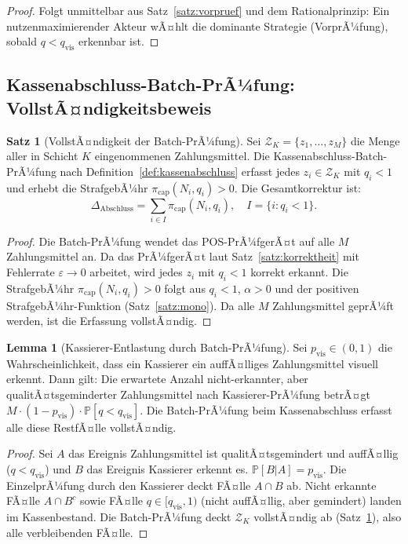 ﻿\documentclass[a4paper,12pt]{article}
\theoremstyle{definition}
\newtheorem{satz}{Satz}
\newtheorem{lemma}{Lemma}
\begin{document}
\begin{proof}
Folgt unmittelbar aus Satz~\ref{satz:vorpruef} und dem Rationalprinzip:
Ein nutzenmaximierender Akteur wÃ¤hlt die dominante Strategie
(VorprÃ¼fung), sobald $q < q_{\text{vis}}$ erkennbar ist.
\end{proof}

\subsection{Kassenabschluss-Batch-PrÃ¼fung: VollstÃ¤ndigkeitsbeweis}

\begin{satz}[VollstÃ¤ndigkeit der Batch-PrÃ¼fung]
\label{satz:batch}
Sei $\mathcal{Z}_K = \{z_1,\ldots,z_M\}$ die Menge aller in Schicht $K$
eingenommenen Zahlungsmittel.  Die Kassenabschluss-Batch-PrÃ¼fung nach
Definition~\ref{def:kassenabschluss} erfasst jedes $z_i \in \mathcal{Z}_K$
mit $q_i < 1$ und erhebt die StrafgebÃ¼hr $\pi_{\text{cap}}(N_i, q_i) > 0$.
Die Gesamtkorrektur ist:
\[
\Delta_{\text{Abschluss}} = \sum_{i \in I} \pi_{\text{cap}}(N_i, q_i),
\quad I = \{i : q_i < 1\}.
\]
\end{satz}

\begin{proof}
Die Batch-PrÃ¼fung wendet das POS-PrÃ¼fgerÃ¤t auf alle $M$ Zahlungsmittel an.
Da das PrÃ¼fgerÃ¤t laut Satz~\ref{satz:korrektheit} mit Fehlerrate
$\varepsilon \to 0$ arbeitet, wird jedes $z_i$ mit $q_i < 1$ korrekt erkannt.
Die StrafgebÃ¼hr $\pi_{\text{cap}}(N_i, q_i) > 0$ folgt aus
$q_i < 1$, $\alpha > 0$ und der positiven StrafgebÃ¼hr-Funktion
(Satz~\ref{satz:mono}).  Da alle $M$ Zahlungsmittel geprÃ¼ft werden,
ist die Erfassung vollstÃ¤ndig.
\end{proof}

\begin{lemma}[Kassierer-Entlastung durch Batch-PrÃ¼fung]
\label{lem:kassierer}
Sei $p_{\text{vis}} \in (0,1)$ die Wahrscheinlichkeit, dass ein Kassierer
ein auffÃ¤lliges Zahlungsmittel visuell erkennt.  Dann gilt:
Die erwartete Anzahl nicht-erkannter, aber qualitÃ¤tsgeminderter Zahlungsmittel
nach Kassierer-PrÃ¼fung betrÃ¤gt $M \cdot (1-p_{\text{vis}}) \cdot \mathbb{P}[q < q_{\text{vis}}]$.
Die Batch-PrÃ¼fung beim Kassenabschluss erfasst alle diese RestfÃ¤lle vollstÃ¤ndig.
\end{lemma}

\begin{proof}
Sei $A$ das Ereignis \glqq{}Zahlungsmittel ist qualitÃ¤tsgemindert und auffÃ¤llig\grqq{}
($q < q_{\text{vis}}$) und $B$ das Ereignis \glqq{}Kassierer erkennt es\grqq{}.
$\mathbb{P}[B|A] = p_{\text{vis}}$.
Die EinzelprÃ¼fung durch den Kassierer deckt FÃ¤lle $A \cap B$ ab.
Nicht erkannte FÃ¤lle $A \cap B^c$ sowie FÃ¤lle $q \in [q_{\text{vis}}, 1)$
(nicht auffÃ¤llig, aber gemindert) landen im Kassenbestand.
Die Batch-PrÃ¼fung deckt $\mathcal{Z}_K$ vollstÃ¤ndig ab (Satz~\ref{satz:batch}),
also alle verbleibenden FÃ¤lle.
\end{proof}
\end{document}

